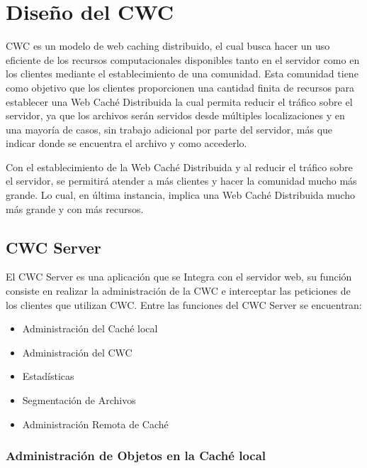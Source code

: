 
\chapter{Diseño del CWC} %

\label{ch:diseno_cwc} %

CWC es un modelo de web caching distribuido, el cual busca hacer un uso eficiente de los recursos computacionales disponibles tanto en el servidor como en los clientes mediante el establecimiento de una comunidad. Esta comunidad tiene como objetivo que los clientes proporcionen una cantidad finita de recursos para establecer una Web Caché Distribuida la cual permita reducir el tráfico sobre el servidor, ya que los archivos serán servidos desde múltiples localizaciones y en una mayoría de casos, sin trabajo adicional por parte del servidor, más que indicar donde se encuentra el archivo y como accederlo. 

Con el establecimiento de la Web Caché Distribuida y al reducir el tráfico sobre el servidor, se permitirá atender a más clientes y hacer la comunidad mucho más grande. Lo cual, en última instancia, implica una Web Caché Distribuida mucho más grande y con más recursos.

\section{CWC Server}

El CWC Server es una aplicación que se Integra con el servidor web, su función consiste en realizar la administración de la CWC e interceptar las peticiones de los clientes que utilizan CWC. Entre las funciones del CWC Server se encuentran: 

\begin{itemize}
\item Administración del Caché local
\item Administración del CWC
\item Estadísticas
\item Segmentación de Archivos
\item Administración Remota de Caché
\end{itemize}


\subsection{Administración de Objetos en la Caché local}

